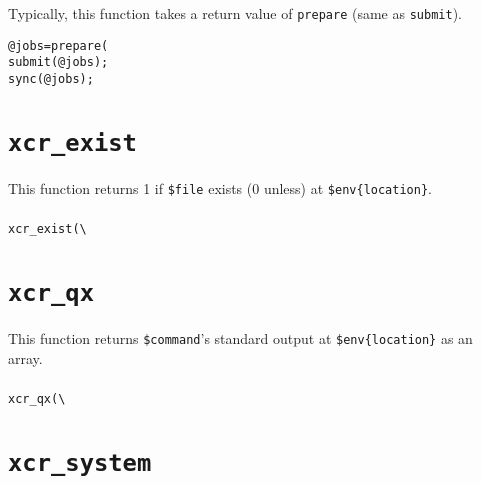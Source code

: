 \documentclass[a4paper,10pt]{report}
\def\|{\verb|} %|
\begin{document}
\subsubsection{\example}

Typically, this function takes a return value of \texttt{prepare}
(same as \texttt{submit}).
\begin{boxnote}
\begin{alltt}
@jobs = prepare(%mytemplate);
submit(@jobs);
sync(@jobs);
\end{alltt}
\end{boxnote}
\vspace{\baselineskip}

\section{\texttt{xcr\_exist}}

This function returns 1 if \texttt{\$file} exists (0 unless) at
\texttt{\$env\{location\}}.

\subsubsection{\format}

\begin{boxnote}
\begin{alltt}
xcr_exist(\|\|%\textit{env}, $file);
\end{alltt}
\end{boxnote}
\vspace{\baselineskip}

\section{\texttt{xcr\_qx}}

This function returns \texttt{\$command}'s standard output at
\texttt{\$env\{location\}} as an array.

\subsubsection{\format}

\begin{boxnote}
\begin{alltt}
xcr_qx(\|\|%\textit{env}, $command);
\end{alltt}
\end{boxnote}
\vspace{\baselineskip}

\section{\texttt{xcr\_system}}
\end{document}
